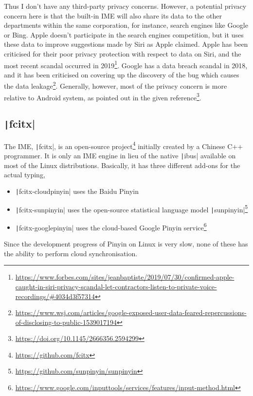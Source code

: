 \documentclass[12pt]{article}
\begin{document}
Thus I don't have any third-party privacy concerns. However, a potential privacy concern here is that the built-in IME will also share its data to the other departments within the same corporation, for instance, search engines like Google or Bing. Apple doesn't participate in the search engines competition, but it uses these data to improve suggestions made by Siri as Apple claimed. Apple has been criticised for their poor privacy protection with respect to data on Siri, and the most recent scandal occurred in 2019\footnote{\url{https://www.forbes.com/sites/jeanbaptiste/2019/07/30/confirmed-apple-caught-in-siri-privacy-scandal-let-contractors-listen-to-private-voice-recordings/\#4034d3f57314}}. Google has a data breach scandal in 2018, and it has been criticised on covering up the discovery of the bug which causes the data leakage\footnote{\url{https://www.wsj.com/articles/google-exposed-user-data-feared-repercussions-of-disclosing-to-public-1539017194}}. Generally, however, most of the privacy concern is more relative to Android system, as pointed out in the given reference\footnote{\url{https://doi.org/10.1145/2666356.2594299}}.

\subsection{\texttt|fcitx|}

The IME, \texttt|fcitx|, is an open-source project\footnote{\url{https://github.com/fcitx}} initially created by a Chinese C++ programmer. It is only an IME engine in lieu of the native \texttt|ibus| available on most of the Linux distributions. Basically, it has three different add-ons for the actual typing,

\begin{itemize}
  \item \texttt|fcitx-cloudpinyin| uses the Baidu Pinyin
  \item \texttt|fcitx-sunpinyin| uses the open-source statistical language model \texttt|sunpinyin|\footnote{\url{https://github.com/sunpinyin/sunpinyin}}
  \item \texttt|fcitx-googlepinyin| uses the cloud-based Google Pinyin service\footnote{\url{https://www.google.com/inputtools/services/features/input-method.html}}
\end{itemize}

Since the development progress of Pinyin on Linux is very slow, none of these has the ability to perform cloud synchronisation.
\end{document}
